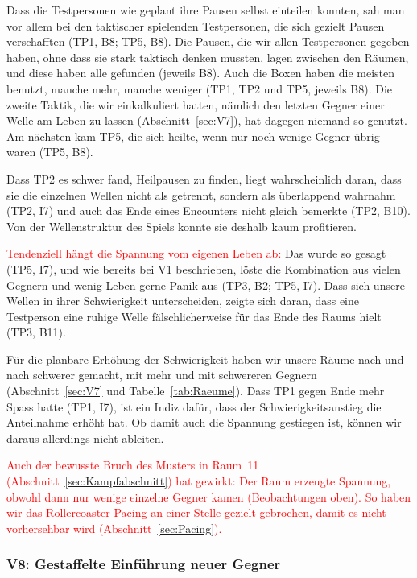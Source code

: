 \documentclass[../Main.tex]{subfiles}
\begin{document}
Dass die Testpersonen wie geplant ihre Pausen selbst einteilen konnten, sah man vor allem bei den taktischer spielenden Testpersonen, die sich gezielt Pausen verschafften (TP1, B8; TP5, B8). Die Pausen, die wir allen Testpersonen gegeben haben, ohne dass sie stark taktisch denken mussten, lagen zwischen den Räumen, und diese haben alle gefunden (jeweils B8). Auch die Boxen haben die meisten benutzt, manche mehr, manche weniger (TP1, TP2 und TP5, jeweils B8). Die zweite Taktik, die wir einkalkuliert hatten, nämlich den letzten Gegner einer Welle am Leben zu lassen (Abschnitt~\ref{sec:V7}), hat dagegen niemand so genutzt. Am nächsten kam TP5, die sich heilte, wenn nur noch wenige Gegner übrig waren (TP5, B8).

Dass TP2 es schwer fand, Heilpausen zu finden, liegt wahrscheinlich daran, dass sie die einzelnen Wellen nicht als getrennt, sondern als überlappend wahrnahm (TP2, I7) und auch das Ende eines Encounters nicht gleich bemerkte (TP2, B10). Von der Wellenstruktur des Spiels konnte sie deshalb kaum profitieren.

\textcolor{red}{Tendenziell hängt die Spannung vom eigenen Leben ab:} Das wurde so gesagt (TP5, I7), und wie bereits bei V1 beschrieben, löste die Kombination aus vielen Gegnern und wenig Leben gerne Panik aus (TP3, B2; TP5, I7). Dass sich unsere Wellen in ihrer Schwierigkeit unterscheiden, zeigte sich daran, dass eine Testperson eine ruhige Welle fälschlicherweise für das Ende des Raums hielt (TP3, B11).

Für die planbare Erhöhung der Schwierigkeit haben wir unsere Räume nach und nach schwerer gemacht, mit mehr und mit schwereren Gegnern (Abschnitt~\ref{sec:V7} und Tabelle~\ref{tab:Raeume}). Dass TP1 gegen Ende mehr Spass hatte (TP1, I7), ist ein Indiz dafür, dass der Schwierigkeitsanstieg die Anteilnahme erhöht hat. Ob damit auch die Spannung gestiegen ist, können wir daraus allerdings nicht ableiten.

\textcolor{red}{Auch der bewusste Bruch des Musters in Raum~11 (Abschnitt~\ref{sec:Kampfabschnitt}) hat gewirkt: Der Raum erzeugte Spannung, obwohl dann nur wenige einzelne Gegner kamen (Beobachtungen oben). So haben wir das Rollercoaster-Pacing an einer Stelle gezielt gebrochen, damit es nicht vorhersehbar wird (Abschnitt~\ref{sec:Pacing}).}

\subsubsection{V8: Gestaffelte Einführung neuer Gegner}
\end{document}

